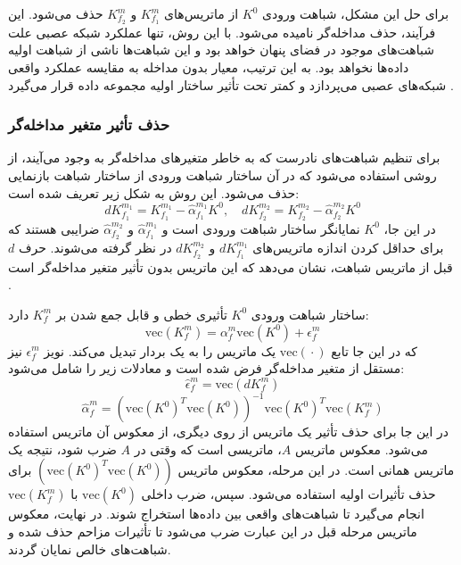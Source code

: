 برای حل این مشکل، شباهت ورودی \(K^0\) از ماتریس‌های \(K^{m}_{f_1}\) و \(K^{m}_{f_2}\) حذف می‌شود. این فرآیند، حذف مداخله‌گر نامیده می‌شود. با این روش، تنها عملکرد شبکه عصبی علت شباهت‌های موجود در فضای پنهان خواهد بود و این شباهت‌ها ناشی از شباهت اولیه داده‌ها نخواهد بود. به این ترتیب، معیار بدون مداخله به مقایسه عملکرد واقعی شبکه‌های عصبی می‌پردازد و کمتر تحت تأثیر ساختار اولیه مجموعه داده قرار می‌گیرد
\cite{cui2022deconfounded}.


\vspace{3mm}
\subsubsection{حذف تأثیر متغیر مداخله‌گر}\vspace{-1mm}
برای تنظیم شباهت‌های نادرست که به خاطر متغیرهای مداخله‌گر به وجود می‌آیند، از روشی استفاده می‌شود که در آن ساختار شباهت ورودی از ساختار شباهت بازنمایی حذف می‌شود. این روش به شکل زیر تعریف شده است:
\begin{equation}
 dK^{m_1}_{f_1} = K^{m_1}_{f_1} - \hat{\alpha}^{m_1}_{f_1} K^0,  \quad
dK^{m_2}_{f_2} = K^{m_2}_{f_2} - \hat{\alpha}^{m_2}_{f_2} K^0
\end{equation}
در این جا، \(K^0\) نمایانگر ساختار شباهت ورودی است و \(\hat{\alpha}^{m_1}_{f_1}\) و \(\hat{\alpha}^{m_2}_{f_2}\) ضرایبی هستند که برای حداقل کردن اندازه‌ ماتریس‌های \(dK^{m_1}_{f_1}\) و \(dK^{m_2}_{f_2}\) در نظر گرفته می‌شوند. حرف \(d\) قبل از ماتریس شباهت، نشان می‌دهد که این ماتریس بدون تأثیر متغیر مداخله‌گر است
\cite{cui2022deconfounded}.

ساختار شباهت ورودی \(K^0\) تأثیری خطی و قابل جمع شدن بر \(K^{m}_{f}\) دارد:
\begin{equation}
	\text{vec}(K^{m}_{f}) = \alpha^{m}_{f} \text{vec}(K^0) + \epsilon^{m}_{f}
\end{equation}
که در این جا تابع \(\text{vec}(‎\cdot)\) یک ماتریس را به یک بردار تبدیل می‌کند. نویز \(\epsilon^{m}_{f}\) نیز مستقل از متغیر مداخله‌گر فرض شده است و معادلات زیر را شامل می‌شود:
\begin{equation}
	\hat{\epsilon}^{m}_{f} = \text{vec}(dK^{m}_{f})
\end{equation}
\vspace{-34}
\begin{equation}
	\hat{\alpha}^{m}_{f} = (\text{vec}(K^0)^T \text{vec}(K^0))^{-1} \text{vec}(K^0)^T \text{vec}(K^{m}_{f})
\end{equation}
در این جا برای حذف تأثیر یک ماتریس از روی دیگری، از معکوس آن ماتریس استفاده می‌شود. معکوس ماتریس \(A\)، ماتریسی است که وقتی در \(A\) ضرب شود، نتیجه یک ماتریس همانی%
است.
در این مرحله، معکوس ماتریس \((\text{vec}(K^0)^T \text{vec}(K^0))\) برای حذف تأثیرات اولیه استفاده می‌شود. سپس، ضرب داخلی \(\text{vec}(K^0)\) با \(\text{vec}(K^{m}_{f})\) انجام می‌گیرد تا شباهت‌های واقعی بین داده‌ها استخراج شوند. در نهایت، معکوس ماتریس مرحله قبل در این عبارت ضرب می‌شود تا تأثیرات مزاحم حذف شده و شباهت‌های خالص نمایان گردند.


